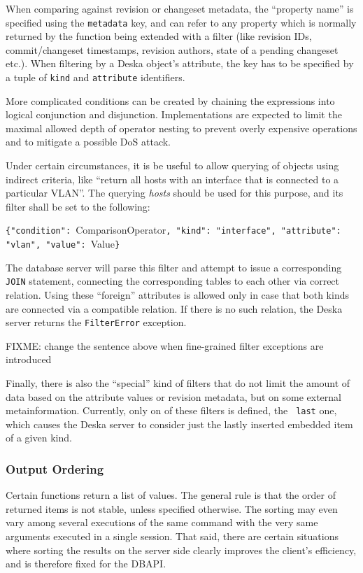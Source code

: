 \documentclass{article}
\begin{document}
When comparing against revision or changeset metadata, the ``property name'' is specified using the {\tt metadata} key,
and can refer to any property which is normally returned by the function being extended with a filter (like revision
IDs, commit/changeset timestamps, revision authors, state of a pending changeset etc.).  When filtering by a Deska
object's attribute, the key has to be specified by a tuple of {\tt kind} and {\tt attribute} identifiers.

More complicated conditions can be created by chaining the expressions into logical conjunction and disjunction.
Implementations are expected to limit the maximal allowed depth of operator nesting to prevent overly expensive
operations and to mitigate a possible DoS attack.

Under certain circumstances, it is be useful to allow querying of objects using indirect criteria, like ``return all
hosts with an interface that is connected to a particular VLAN''.  The  querying {\em
hosts} should be used for this purpose, and its filter shall be set to the following:

{\tt \{"condition": }ComparisonOperator{\tt, "kind": "interface", "attribute": "vlan", "value": }Value{\tt \}}

The database server will parse this filter and attempt to issue a corresponding {\tt JOIN} statement, connecting the
corresponding tables to each other via correct relation.  Using these
``foreign'' attributes is allowed only in case that both kinds are connected via a compatible relation.  If there is no
such relation, the Deska server returns the {\tt FilterError} exception.

FIXME: change the sentence above when fine-grained filter exceptions are introduced

Finally, there is also the ``special'' kind of filters that do not limit the amount of data based on the attribute values
or revision metadata, but on some external metainformation.  Currently, only on of these filters is defined, the {\tt
last} one, which causes the Deska server to consider just the lastly inserted embedded item of a given kind.

\subsubsection{Output Ordering}

Certain functions return a list of values.  The general rule is that the order of returned items is not stable, unless
specified otherwise.  The sorting may even vary among several executions of the same command with the very same
arguments executed in a single session.  That said, there are certain situations where sorting the results on the server
side clearly improves the client's efficiency, and is therefore fixed for the DBAPI.
\end{document}

